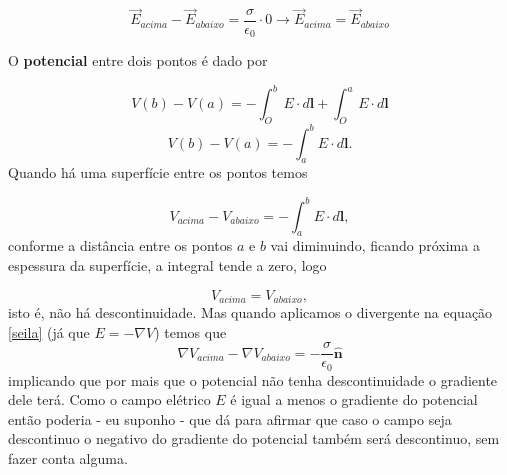 \[\Vec{E}_{acima} - \Vec{E}_{abaixo} = \frac{\sigma}{\epsilon_{0}} \cdot 0 \xrightarrow{}\Vec{E}_{acima} = \Vec{E}_{abaixo}\]




    


O \textbf{potencial} entre dois pontos é dado por

\[V(b)-V(a) = - \int_{O}^{b} E\cdot d\textbf{l} +\int_{O}^{a} E\cdot d\textbf{l} \]
\[V(b)-V(a) = - \int_{a}^{b} E\cdot d\textbf{l}.\]
Quando há uma superfície entre os pontos temos


\[V_{acima} - V_{abaixo} = - \int_{a}^{b} E \cdot d\textbf{l},\]
conforme a distância entre os pontos $a$ e $b$ vai diminuindo, ficando próxima a espessura da superfície, a integral tende a zero, logo 


\[V_{acima} = V_{abaixo},\]
isto é, não há descontinuidade. Mas quando aplicamos o divergente na equação \ref{seila} (já que \(E = -\nabla V\)) temos que
\[\nabla V_{acima}-\nabla V_{abaixo} = -\frac{\sigma}{\epsilon_{0}} \hat{\textbf{n}}\]
implicando que por mais que o potencial não tenha descontinuidade o gradiente dele terá. Como o campo elétrico $E$ é igual a menos o gradiente do potencial então poderia - eu suponho - que dá para afirmar que caso o campo seja descontinuo o negativo do gradiente do potencial também será descontinuo, sem fazer conta alguma. 